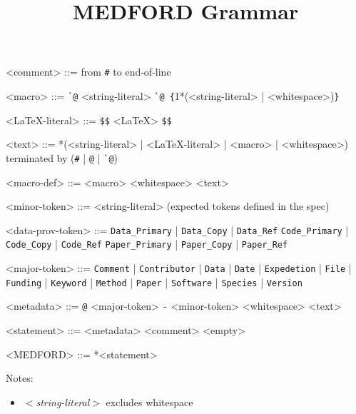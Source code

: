\documentclass{article}
\begin{document}
\title{MEDFORD Grammar}
\date{}
\maketitle

\setlength{\grammarindent}{10em} %

\newcommand{\ttt}[1]{\texttt{#1}}

\begin{grammar}

<comment> ::= from \ttt{\#} to end-of-line

<macro> ::= \ttt{\`{}@} <string-literal>
\alt \ttt{\`{}@ \{}1*(<string-literal> | <whitespace>)\ttt{\}}

<\LaTeX-literal> ::= \ttt{\$\$} <\LaTeX> \ttt{\$\$}

<text> ::= *(<string-literal> | <\LaTeX-literal> | <macro> | <whitespace>) 
terminated by (\ttt{\#} | \ttt{@} | \ttt{\`{}@})

<macro-def> ::= <macro> <whitespace> <text>

<minor-token> ::= <string-literal> (expected tokens defined in the spec)

<data-prov-token> ::= \ttt{Data\_Primary} | \ttt{Data\_Copy} | \ttt{Data\_Ref}
\alt \ttt{Code\_Primary} | \ttt{Code\_Copy} | \ttt{Code\_Ref}
\alt \ttt{Paper\_Primary} | \ttt{Paper\_Copy} | \ttt{Paper\_Ref}

<major-token> ::= \ttt{Comment} | \ttt{Contributor} | \ttt{Data} | \ttt{Date} | \ttt{Expedetion} | \ttt{File} | \ttt{Funding} | \ttt{Keyword} | \ttt{Method} | \ttt{Paper} | \ttt{Software} | \ttt{Species} | \ttt{Version}

<metadata> ::= \ttt{@} <major-token> \ttt{-} <minor-token> <whitespace> <text>

<statement> ::= <metadata>
\alt <comment>
\alt <empty>

<MEDFORD> ::= *<statement>

\end{grammar}

\bigskip

Notes: 
\begin{itemize}
    \item \textit{\(<\)string-literal\(>\)} excludes whitespace
\end{itemize}

%  




\end{document}
